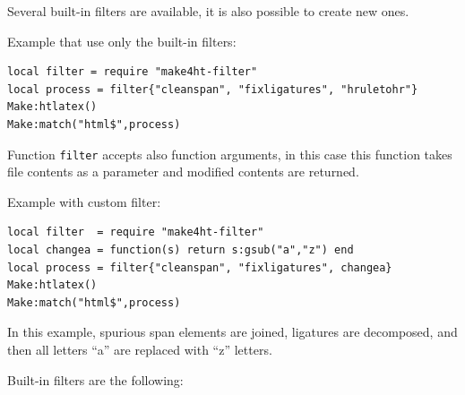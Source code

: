 Several built-in filters are available, it is also possible to create
new ones.

Example that use only the built-in filters:

\begin{verbatim}
local filter = require "make4ht-filter"
local process = filter{"cleanspan", "fixligatures", "hruletohr"}
Make:htlatex()
Make:match("html$",process)
\end{verbatim}

Function \texttt{filter} accepts also function arguments, in this case
this function takes file contents as a parameter and modified contents
are returned.

Example with custom filter:

\begin{verbatim}
local filter  = require "make4ht-filter"
local changea = function(s) return s:gsub("a","z") end
local process = filter{"cleanspan", "fixligatures", changea}
Make:htlatex()
Make:match("html$",process)
\end{verbatim}

In this example, spurious span elements are joined, ligatures are
decomposed, and then all letters ``a'' are replaced with ``z'' letters.

Built-in filters are the following:

